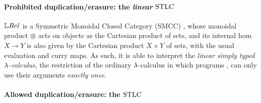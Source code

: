 \paragraph*{Prohibited duplication/erasure: the \emph{linear} $\mathrm{STLC}$}\label{sec:3A}

$\LREL$ is a Symmetric Monoidal Closed Category (SMCC) \cite[Section III.A]{Manzo2013}, %
whose monoidal product $\otimes$ acts on objects as the Cartesian product of sets, %
 and its internal hom $X\multimap Y$ is also given by the Cartesian product $X\times Y$ of sets, with the usual evaluation and curry maps.
As such, it is able to interpret the \emph{linear simply typed $\lambda$-calculus}, the restriction of the ordinary $\lambda$-calculus in which programs ,%
can only use their arguments \emph{exactly once}. %


\paragraph*{Allowed duplication/erasure: the $\mathrm{STLC}$}\label{sec:STLC}

